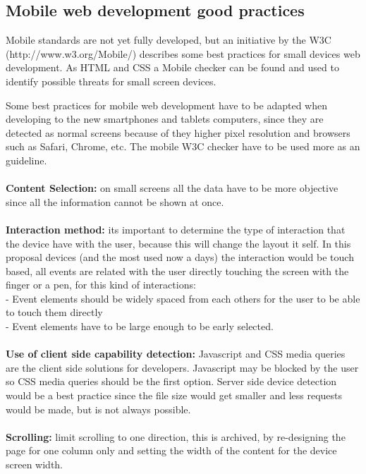 \subsection{Mobile web development good practices}

Mobile standards are not yet fully developed, but an initiative by the W3C (http://www.w3.org/Mobile/) describes some best practices for small devices web development. As HTML and CSS a Mobile checker can be found and used to identify possible threats for small screen devices.

Some best practices for mobile web development have to be adapted when developing to the new smartphones and tablets computers, since they are detected as normal screens because of they higher pixel resolution and browsers such as Safari, Chrome, etc. The mobile W3C checker have to be used more as an guideline. 
\\
\\ \textbf{Content Selection:} on small screens all the data have to be more objective since all the information cannot be shown at once.\\
\\ \textbf{Interaction method:} its important to determine the type of interaction that the device have with the user, because this will change the layout it self. In this proposal devices (and the most used now a days) the interaction would be touch based, all events are related with the user directly touching the screen with the finger or a pen, for this kind of interactions:\\
- Event elements should be widely spaced from each others for the user to be able to touch them directly\\
- Event elements have to be large enough to be early selected.\\
\\\textbf{Use of client side capability detection:} Javascript and CSS media queries are the client side solutions for developers. Javascript may be blocked by the user so CSS media queries should be the first option. Server side device detection would be a best practice since the file size would get smaller and less requests would be made, but is not always possible.\\
\\\textbf{Scrolling:} limit scrolling to one direction, this is archived, by re-designing the page for one column only and setting the width of the content for the device screen width.\\



